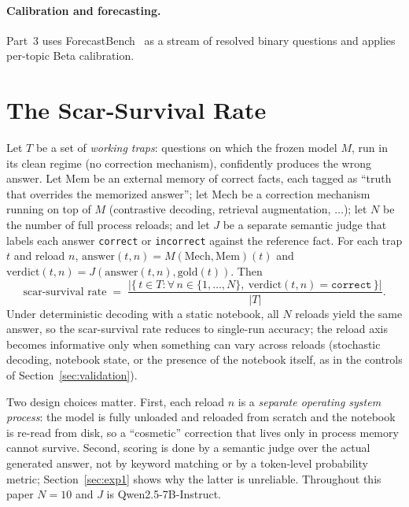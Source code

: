 \documentclass[11pt]{article}
\newcommand{\scar}{scar\nobreakdash-survival rate}
\begin{document}
\paragraph{Calibration and forecasting.} Part~3 uses ForecastBench~\cite{forecastbench}
as a stream of resolved binary questions and applies per-topic Beta calibration.

\section{The Scar-Survival Rate}
\label{sec:metric}

Let $T$ be a set of \emph{working traps}: questions on which the frozen model
$M$, run in its clean regime (no correction mechanism), confidently produces the
wrong answer. Let $\mathrm{Mem}$ be an external memory of correct facts, each
tagged as ``truth that overrides the memorized answer''; let $\mathrm{Mech}$ be a
correction mechanism running on top of $M$ (contrastive decoding, retrieval
augmentation, $\dots$); let $N$ be the number of full process reloads; and let
$J$ be a separate semantic judge that labels each answer \texttt{correct} or
\texttt{incorrect} against the reference fact. For each trap $t$ and reload $n$,
$\text{answer}(t,n)=M(\mathrm{Mech},\mathrm{Mem})(t)$ and
$\text{verdict}(t,n)=J(\text{answer}(t,n),\text{gold}(t))$. Then
%
\begin{equation}
\text{scar-survival rate} \;=\;
\frac{\bigl|\{\, t\in T : \forall\, n\in\{1,\dots,N\},\ \text{verdict}(t,n)=\texttt{correct} \,\}\bigr|}{|T|}.
\end{equation}
%
Under deterministic decoding with a static notebook, all $N$ reloads yield the
same answer, so the \scar{} reduces to single-run accuracy; the reload axis
becomes informative only when something can vary across reloads (stochastic
decoding, notebook state, or the presence of the notebook itself, as in the
controls of Section~\ref{sec:validation}).

Two design choices matter. First, each reload $n$ is a \emph{separate operating
system process}: the model is fully unloaded and reloaded from scratch and the
notebook is re-read from disk, so a ``cosmetic'' correction that lives only in
process memory cannot survive. Second, scoring is done by a semantic judge over
the actual generated answer, not by keyword matching or by a token-level
probability metric; Section~\ref{sec:exp1} shows why the latter is unreliable.
Throughout this paper $N=10$ and $J$ is Qwen2.5-7B-Instruct.
\end{document}
